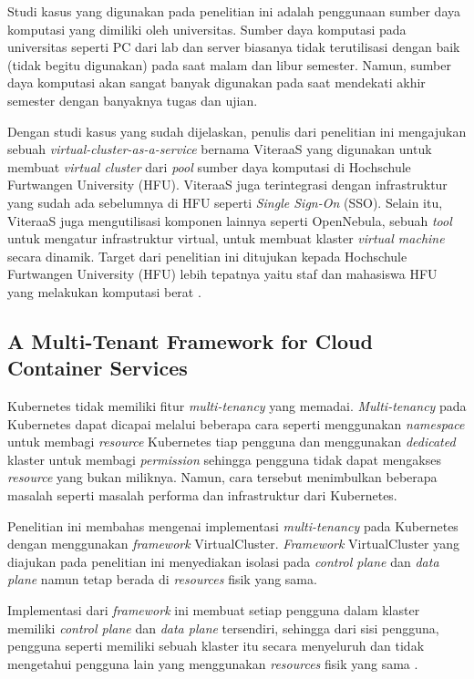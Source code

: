 Studi kasus yang digunakan pada penelitian ini adalah penggunaan sumber daya komputasi yang dimiliki oleh
universitas. Sumber daya komputasi pada universitas seperti PC dari lab dan server biasanya tidak
terutilisasi dengan baik (tidak begitu digunakan) pada saat malam dan libur semester. Namun, sumber daya
komputasi akan sangat banyak digunakan pada saat mendekati akhir semester dengan banyaknya tugas dan
ujian.

Dengan studi kasus yang sudah dijelaskan, penulis dari penelitian ini mengajukan sebuah \emph{virtual-cluster-as-a-service} bernama ViteraaS
yang digunakan untuk membuat \emph{virtual cluster} dari \emph{pool} sumber daya komputasi di Hochschule Furtwangen University (HFU).
ViteraaS juga terintegrasi dengan infrastruktur yang sudah ada sebelumnya di HFU seperti \emph{Single Sign-On} (SSO).
Selain itu, ViteraaS juga mengutilisasi komponen lainnya seperti OpenNebula, sebuah \emph{tool} untuk mengatur infrastruktur virtual,
untuk membuat klaster \emph{virtual machine} secara dinamik.
Target dari penelitian ini ditujukan kepada Hochschule Furtwangen University (HFU) lebih tepatnya
yaitu staf dan mahasiswa HFU yang melakukan komputasi berat \parencite{6133210}.

\subsection{A Multi-Tenant Framework for Cloud Container Services}

Kubernetes tidak memiliki fitur \emph{multi-tenancy} yang memadai. \emph{Multi-tenancy}
pada Kubernetes dapat dicapai melalui beberapa cara seperti menggunakan \emph{namespace}
untuk membagi \emph{resource} Kubernetes tiap pengguna dan menggunakan \emph{dedicated} klaster
untuk membagi \emph{permission} sehingga pengguna tidak dapat mengakses \emph{resource}
yang bukan miliknya. Namun, cara tersebut menimbulkan beberapa masalah seperti masalah
performa dan infrastruktur dari Kubernetes.

Penelitian ini membahas mengenai implementasi \emph{multi-tenancy} pada
Kubernetes dengan menggunakan \emph{framework} VirtualCluster. \emph{Framework}
VirtualCluster yang diajukan pada penelitian ini menyediakan isolasi pada \emph{control plane}
dan \emph{data plane} namun tetap berada di \emph{resources} fisik yang sama.

Implementasi dari \emph{framework} ini membuat setiap pengguna dalam klaster
memiliki \emph{control plane} dan \emph{data plane} tersendiri, sehingga dari
sisi pengguna, pengguna seperti memiliki sebuah klaster itu secara menyeluruh
dan tidak mengetahui pengguna lain yang menggunakan \emph{resources} fisik yang sama
\parencite{9546524}.

